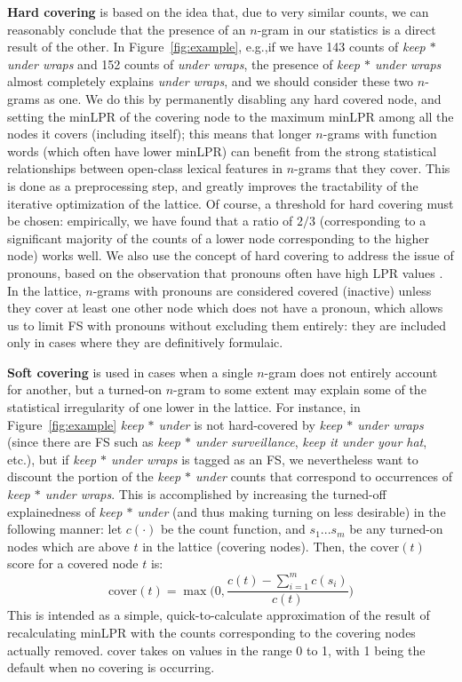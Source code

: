 \documentclass[11pt,letterpaper]{article}
\makeatletter
\def \eg {e.g.,\@ }
\def \etc {etc.\@ }
\newcommand{\dotts}{...}
\newcommand{\gap}{$*$\xspace}
\newcommand{\ex}[1]{\textit{#1}\xspace}
\newcommand{\termdef}[1]{\textbf{#1}\xspace}
\newcommand{\cover}{\ensuremath{\text{cover}}\xspace}
\newcommand{\figref}[2][]{Figure#1~\ref{#2}\xspace}
\makeatother
\begin{document}
\termdef{Hard covering} is based on the idea that, due to very similar counts, we can reasonably conclude that the presence of an $n$-gram in our statistics is a direct result of the other. In \figref{fig:example}, \eg if we have 143 counts of \ex{keep \gap under wraps} and 152 counts of \ex{under wraps}, the presence of \ex{keep \gap under wraps} almost completely explains \ex{under wraps}, and we should consider these two $n$-grams as one. We do this by permanently disabling any hard covered node, and setting the minLPR of the covering node to the maximum minLPR among all the nodes it covers (including itself); this means that longer $n$-grams with function words (which often have lower minLPR) can benefit from the strong statistical relationships between open-class lexical features in $n$-grams that they cover. This is done as a preprocessing step, and greatly improves the tractability of the iterative optimization of the lattice. Of course, a threshold for hard covering must be chosen: empirically, we have found that a ratio of $2/3$ (corresponding to a significant majority of the counts of a lower node corresponding to the higher node) works well.  We also use the concept of hard covering to address the issue of pronouns, based on the observation that pronouns often have high LPR values \cite{Brooke15b}. In the lattice, $n$-grams with pronouns are considered covered (inactive) unless they cover at least one other node which does not have a pronoun, which allows us to limit FS with pronouns without excluding them entirely: they are included only in cases where they are definitively formulaic. 

\termdef{Soft covering} is used in cases when a single $n$-gram does not entirely account for another, but a turned-on $n$-gram to some extent may explain some of the statistical irregularity of one lower in the lattice. For instance, in \figref{fig:example} \ex{keep \gap under} is not hard-covered by \ex{keep \gap under wraps} (since there are FS such as \ex{keep \gap under surveillance}, \ex{keep it under your hat}, \etc), but if \ex{keep \gap under wraps} is tagged as an FS, we nevertheless want to discount the portion of the \ex{keep \gap under} counts that correspond to occurrences of \ex{keep \gap under wraps}. This is accomplished by increasing the turned-off explainedness of \ex{keep \gap under} (and thus making turning on less desirable) in the following manner: let $c(\cdot)$ be the count function, and $s_1\dotts s_m$ be any turned-on nodes which are above $t$ in the lattice (covering nodes). Then, the $\cover(t)$ score for a covered node $t$ is:
\begin{displaymath}
\cover(t) = \max\Big(0,\frac{c(t) - \sum_{i=1}^{m}{c(s_i)}}{c(t)}\Big)
\end{displaymath}
This is intended as a simple, quick-to-calculate approximation of the result of recalculating minLPR with the counts corresponding to the covering nodes actually removed. \cover takes on values in the range 0 to 1, with 1 being the default when no covering is occurring.
\end{document}
